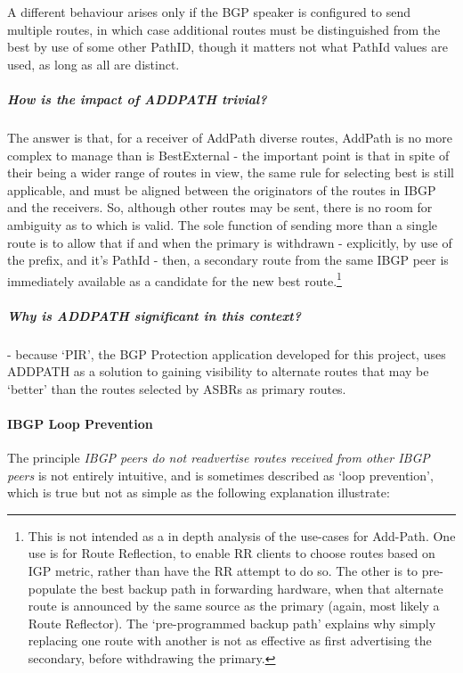 A different behaviour arises only if the BGP speaker is configured to send multiple routes, in which case additional routes must be distinguished from the best by use of some other PathID, though it matters not what PathId values are used, as long as all are distinct.

\subparagraph{How is the impact of ADDPATH trivial?}
The answer is that, for a receiver of AddPath diverse routes, AddPath is no more complex to manage  than is BestExternal - the important point is that in spite of their being a wider range of routes in view, the same rule for selecting best is still applicable, and must be aligned between the originators of the routes in IBGP and the receivers.  So, although other routes may be sent, there is no room for ambiguity as to which is valid.  The sole function of sending more than a single route is to allow that if and when the primary is withdrawn - explicitly, by use of the prefix, and it's PathId - then, a secondary route from the same IBGP peer is immediately available as a candidate for the new best route.\footnote{This is not intended as a in depth analysis of the use-cases for Add-Path.  One use is for Route Reflection, to enable RR clients to choose routes based on IGP metric, rather than have the RR attempt to do so.  The other is to pre-populate the best backup path in forwarding hardware, when that alternate route is announced by the same source as the primary (again, most likely a Route Reflector).  The `pre-programmed backup path' explains why simply replacing one route with another is not as effective as first advertising the secondary, before withdrawing the primary.}

\subparagraph{Why is ADDPATH significant in this context?} - because `PIR', the BGP Protection application developed for this project, uses ADDPATH as a solution to gaining visibility to alternate routes that may be `better' than the routes selected by ASBRs as primary routes.

\paragraph{IBGP Loop Prevention}

The principle  \textit{IBGP peers do not readvertise routes received from other IBGP peers}
is not entirely intuitive, and is sometimes described as `loop prevention', which is true but not as simple as the following
explanation illustrate:


